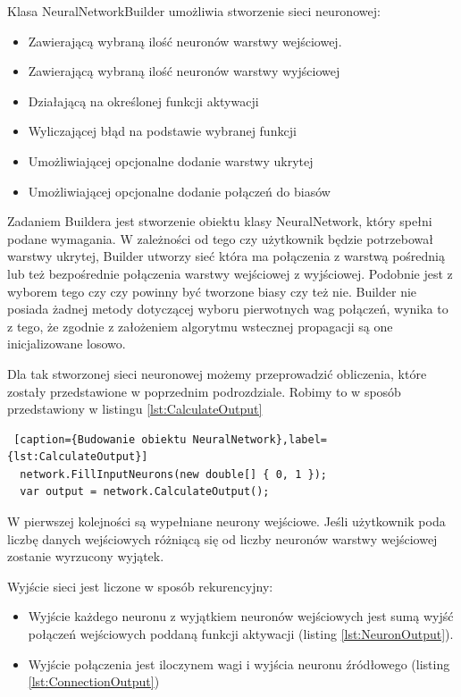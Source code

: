 Klasa NeuralNetworkBuilder umożliwia stworzenie sieci neuronowej:
\begin{itemize}
  \item Zawierającą wybraną ilość neuronów warstwy wejściowej.
  \item Zawierającą wybraną ilość neuronów warstwy wyjściowej
  \item Działającą na określonej funkcji aktywacji
  \item Wyliczającej błąd na podstawie wybranej funkcji
  \item Umożliwiającej opcjonalne dodanie warstwy ukrytej
  \item Umożliwiającej opcjonalne dodanie połączeń do biasów
\end{itemize}

Zadaniem Buildera jest stworzenie obiektu klasy NeuralNetwork, który spełni podane wymagania. 
W zależności od tego czy użytkownik będzie potrzebował warstwy ukrytej, Builder utworzy sieć która ma połączenia z warstwą pośrednią lub też bezpośrednie połączenia warstwy wejściowej z wyjściowej.
Podobnie jest z wyborem tego czy czy powinny być tworzone biasy czy też nie.
Builder nie posiada żadnej metody dotyczącej wyboru pierwotnych wag połączeń, wynika to z tego, że zgodnie z założeniem algorytmu wstecznej propagacji są one inicjalizowane losowo.

Dla tak stworzonej sieci neuronowej możemy przeprowadzić obliczenia, które zostały przedstawione w poprzednim podrozdziale.
Robimy to w sposób przedstawiony w listingu \ref{lst:CalculateOutput}

\begin{lstlisting} [caption={Budowanie obiektu NeuralNetwork},label={lst:CalculateOutput}]
  network.FillInputNeurons(new double[] { 0, 1 });
  var output = network.CalculateOutput();
\end{lstlisting}

W pierwszej kolejności są wypełniane neurony wejściowe.
Jeśli użytkownik poda liczbę danych wejściowych różniącą się od liczby neuronów warstwy wejściowej zostanie wyrzucony wyjątek.

Wyjście sieci jest liczone w sposób rekurencyjny:
\begin{itemize}
  \item Wyjście każdego neuronu z wyjątkiem neuronów wejściowych jest sumą wyjść połączeń wejściowych poddaną funkcji aktywacji (listing \ref{lst:NeuronOutput}).
  \item Wyjście połączenia jest iloczynem wagi i wyjścia neuronu źródłowego (listing \ref{lst:ConnectionOutput})
\end{itemize}

